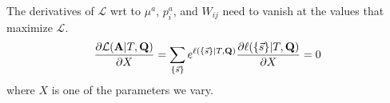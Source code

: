 \documentclass[aps,rmp, onecolumn]{revtex4}
\newcommand{\mat}[1]{{\bf #1}}
\newcommand{\eqp}{p}
\newcommand{\LH}{\mathcal{L}}
\newcommand{\lh}{\ell}
\begin{document}

The derivatives of $\LH$ wrt to $\mu^a$, $\eqp_i^a$, and $W_{ij}$ need to vanish at the values that maximize $\LH$.
\begin{equation}
	\frac{\partial \LH(\mat{A}|T,\mat{Q})}{\partial X} = \sum_{\{\vec{s}\}} e^{\lh(\{\vec{s}\} |T, \mat{Q})} \frac{\partial \ell(\{\vec{s}\}|T,\mat{Q})}{\partial X} = 0
\end{equation}
where $X$ is one of the parameters we vary.
\end{document}
